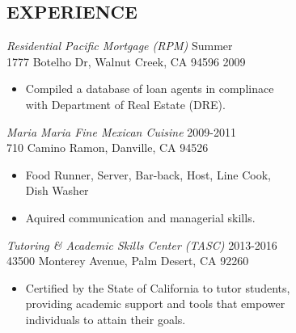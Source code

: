 \documentclass[line,margin]{res}
\begin{document}
\begin{resume}
\section{EXPERIENCE} 
                  {\sl Residential Pacific Mortgage (RPM)} 
                     \hfill Summer \\
                  1777 Botelho Dr, Walnut Creek, CA 94596 
                     \hfill 2009\\
                  \begin{itemize}  
                     \itemsep -2pt %
                     \item Compiled a database of loan agents in 
                        complinace \\ with Department of 
                        Real Estate (DRE). 
                  \end{itemize}
                 
                  {\sl Maria Maria Fine Mexican Cuisine} 
                     \hfill 2009-2011 \\
                  710 Camino Ramon, Danville, CA 94526  
                  \begin{itemize}  
                     \itemsep -2pt %
                     \item Food Runner, Server, Bar-back, Host, 
                        Line Cook, \\ Dish Washer 
                     \item Aquired communication 
                        and managerial skills. 
                  \end{itemize} 
                 
                  {\sl Tutoring \& Academic Skills Center (TASC)} 
                     \hfill 2013-2016 \\
                  43500 Monterey Avenue, Palm Desert, CA 92260
                  \begin{itemize} \itemsep -2pt
                     \item Certified by the State of California 
                        to tutor students,\\ providing academic 
                        support and tools that empower \\ 
                        individuals to attain their goals.   
                  \end{itemize} 



\end{resume}
\end{document}
